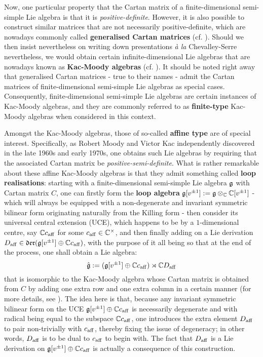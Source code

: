         Now, one particular property that the Cartan matrix of a finite-dimensional semi-simple Lie algebra is that it is \textit{positive-definite}. However, it is also possible to construct similar matrices that are not necessarily positive-definite, which are nowadays commonly called \textbf{generalised Cartan matrices} (cf. \cite[Chapter 1]{kac_infinite_dimensional_lie_algebras}). Should we then insist nevertheless on writing down presentations \textit{\`a la} Chevalley-Serre nevertheless, we would obtain certain infinite-dimensional Lie algebras that are nowadays known as \textbf{Kac-Moody algebras} (cf. \cite[Chapter 1]{kac_infinite_dimensional_lie_algebras}). It should be noted right away that generalised Cartan matrices - true to their names - admit the Cartan matrices of finite-dimensional semi-simple Lie algebras as special cases. Consequently, finite-dimensional semi-simple Lie algebras are certain instances of Kac-Moody algebras, and they are commonly referred to as \textbf{finite-type} Kac-Moody algebras when considered in this context.
        
        Amongst the Kac-Moody algebras, those of so-called \textbf{affine type} are of special interest. Specifically, as Robert Moody and Victor Kac independently discovered in the late 1960s and early 1970s, one obtains such Lie algebras by requiring that the associated Cartan matrix be \textit{positive-semi-definite}. What is rather remarkable about these affine Kac-Moody algebras is that they admit something called \textbf{loop realisations}: starting with a finite-dimensional semi-simple Lie algebra $\mathfrak{g}$ with Cartan matrix $C$, one can firstly form the \textbf{loop algebra} $\g[v^{\pm 1}] := \g \tensor_{\bbC} \bbC[v^{\pm 1}]$ - which will always be equipped with a non-degenerate and invariant symmetric bilinear form originating naturally from the Killing form - then consider its universal central extension (UCE), which happens to be by a $1$-dimensional centre, say $\mathbb{C} c_{\mathrm{aff}}$ for some $c_{\aff} \in \bbC^{\x}$, and then finally adding on a Lie derivation $D_{\mathrm{aff}} \in \mathfrak{der}(\mathfrak{g}[v^{\pm 1}] \oplus \mathbb{C} c_{\mathrm{aff}})$, with the purpose of it all being so that at the end of the process, one shall obtain a Lie algebra:
            $$\hat{\mathfrak{g}} := (\mathfrak{g}[v^{\pm 1}] \oplus \mathbb{C} c_{\mathrm{aff}}) \rtimes \mathbb{C} D_{\mathrm{aff}}$$
        that is isomorphic to the Kac-Moody algebra whose Cartan matrix is obtained from $C$ by adding one extra row and one extra column in a certain manner (for more details, see \cite[Chapter 7]{kac_infinite_dimensional_lie_algebras}). The idea here is that, because any invariant symmetric bilinear form on the UCE $\mathfrak{g}[v^{\pm 1}] \oplus \mathbb{C} c_{\mathrm{aff}}$ is necessarily degenerate and with radical being equal to the subspace $\mathbb{C} c_{\mathrm{aff}}$, one introduces the extra element $D_{\mathrm{aff}}$ to pair non-trivially with $c_{\mathrm{aff}}$, thereby fixing the issue of degeneracy; in other words, $D_{\mathrm{aff}}$ is to be dual to $c_{\mathrm{aff}}$ to begin with. The fact that $D_{\mathrm{aff}}$ is a Lie derivation on $\mathfrak{g}[v^{\pm 1}] \oplus \mathbb{C} c_{\mathrm{aff}}$ is actually a consequence of this construction.
        
